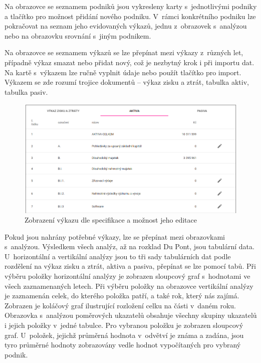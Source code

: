 Na obrazovce se seznamem podniků jsou vykresleny karty s~jednotlivými podniky a tlačítko pro možnost přidání nového podniku. V~rámci konkrétního podniku lze pokračovat na seznam jeho evidovaných výkazů, jednu z~obrazovek s~analýzou nebo na obrazovku srovnání s~jiným podnikem. 

Na obrazovce se seznamem výkazů se lze přepínat mezi výkazy z~různých let, případně výkaz smazat nebo přidat nový, což je nezbytný krok i při importu dat. Na kartě s~výkazem lze ručně vyplnit údaje nebo použít tlačítko pro import. Výkazem se zde rozumí trojice dokumentů -- výkaz zisku a ztrát, tabulka aktiv, tabulka pasiv.

\begin{figure}[!htb]
  \centering
  \includegraphics[width=14cm]{img/scr_editor.png}
  \caption{Zobrazení výkazu dle specifikace a možnost jeho editace}
\end{figure}

Pokud jsou nahrány potřebné výkazy, lze se přepínat mezi obrazovkami s~analýzou. Výsledkem všech analýz, až na rozklad Du Pont, jsou tabulární data. U~horizontální a vertikální analýzy jsou to tři sady tabulárních dat podle rozdělení na výkaz zisku a ztrát, aktiva a pasiva, přepínat se lze pomocí tabů. Při výběru položky horizontální analýzy je zobrazen sloupcový graf s~hodnotami ve všech zaznamenaných letech. Při výběru položky na obrazovce vertikální analýzy je zaznamenán celek, do kterého položka patří, a také rok, který nás zajímá. Zobrazen je koláčový graf ilustrující rozložení celku na části v~daném roku. Obrazovka s~analýzou poměrových ukazatelů obsahuje všechny skupiny ukazatelů i jejich položky v~jedné tabulce. Pro vybranou položku je zobrazen sloupcový graf. U~položek, jejichž průměrná hodnota v~odvětví je známa a zadána, jsou tyro průměrné hodnoty zobrazovány vedle hodnot vypočítaných pro vybraný podnik.

